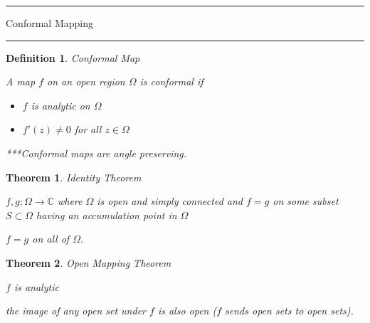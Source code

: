 \documentclass[12pt]{Qual}
\newtheorem{theorem}{Theorem}
\newtheorem{definition}{Definition}
\begin{document}
\newpage








\begin{center}
\noindent\textcolor{blue!60!black}{\rule{15cm}{1mm}}
\Huge \faBug\faPuzzlePiece\faCoffee Conformal Mapping \faCoffee\faPuzzlePiece\faBug
\vspace{-0.5cm}
\noindent\textcolor{blue!60!black}{\rule{15cm}{1mm}}
\end{center}
\vspace{0.25cm}
\begin{definition}{\Large\textit{Conformal Map}}

A map $f$ on an open region $\Omega$ is conformal if
\begin{itemize}
\renewcommand\labelitemi{\faCoffee}
    \item $f$ is analytic on $\Omega$
    \item $f'(z)\not=0$ for all $z\in\Omega$
\end{itemize}

***Conformal maps are angle preserving.
\end{definition}
\begin{theorem}{\Large\textit{Identity Theorem}}

 \begin{minipage}{0.85\textwidth}
\vspace{0.45cm}
 $f,g:\Omega\to\mathbb{C}$ where $\Omega$ is open and simply connected and $f=g$ on some subset $S\subset\Omega$ having an accumulation point in $\Omega$
\end{minipage}


 $f=g$ on all of $\Omega.$

\end{theorem}
\vspace{0.25cm}
\begin{theorem}{\Large\textit{Open Mapping Theorem}}

 $f$ is analytic

\begin{minipage}{0.85\textwidth}
\vspace{0.45cm}
the image of any open set under $f$ is also open ($f$ sends open sets to open sets).
\end{minipage}



\end{theorem}
\end{document}
